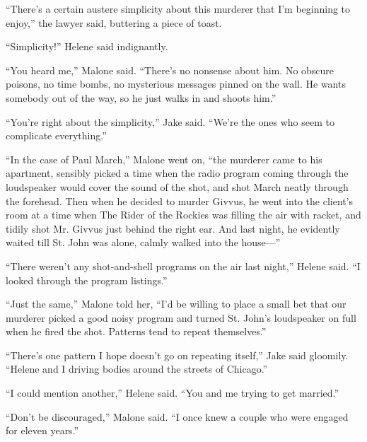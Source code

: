 \documentclass{novel}
\begin{document}
\begin{ChapterStart}
\vspace{3\nbs}
\end{ChapterStart}

“There’s a certain austere simplicity about this murderer that I’m beginning to enjoy,” the lawyer said, buttering a piece of toast.

“Simplicity!” Helene said indignantly.

“You heard me,” Malone said. “There’s no nonsense about him. No obscure poisons, no time bombs, no mysterious messages pinned on the wall. He wants somebody out of the way, so he just walks in and shoots him.”

“You’re right about the simplicity,” Jake said. “We’re the ones who seem to complicate everything.”

“In the case of Paul March,” Malone went on, “the murderer came to his apartment, sensibly picked a time when the radio program coming through the loudspeaker would cover the sound of the shot, and shot March neatly through the forehead. Then when he decided to murder Givvus, he went into the client’s room at a time when The Rider of the Rockies was filling the air with racket, and tidily shot Mr. Givvus just behind the right ear. And last night, he evidently waited till St. John was alone, calmly walked into the house—”

“There weren’t any shot-and-shell programs on the air last night,” Helene said. “I looked through the program listings.”

“Just the same,” Malone told her, “I'd be willing to place a small bet that our murderer picked a good noisy program and turned St. John’s loudspeaker on full when he fired the shot. Patterns tend to repeat themselves.”

“There’s one pattern I hope doesn’t go on repeating itself,” Jake said gloomily. “Helene and I driving bodies around the streets of Chicago.”

“I could mention another,” Helene said. “You and me trying to get married.”

“Don’t be discouraged,” Malone said. “I once knew a couple who were engaged for eleven years.”
\end{document}
